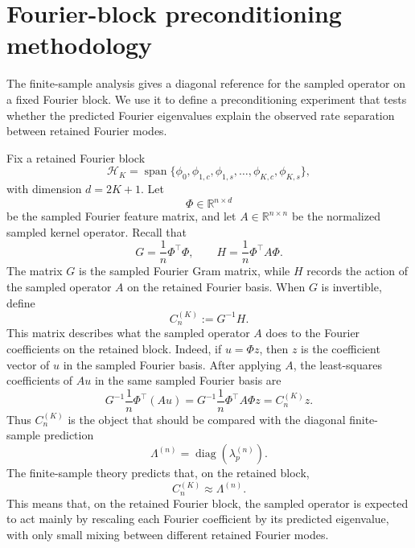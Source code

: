 \section{Fourier-block preconditioning methodology}
\label{sec:method-preconditioning}

The finite-sample analysis gives a diagonal reference for the sampled operator on
a fixed Fourier block. We use it to define a preconditioning experiment that tests
whether the predicted Fourier eigenvalues explain the observed rate separation
between retained Fourier modes.

Fix a retained Fourier block
\[
	\mathcal H_K
	=
	\operatorname{span}\{\phi_0,\phi_{1,c},\phi_{1,s},\dots,\phi_{K,c},\phi_{K,s}\},
\]
with dimension \(d=2K+1\). Let
\[
	\Phi\in\mathbb R^{n\times d}
\]
be the sampled Fourier feature matrix, and let \(A\in\mathbb R^{n\times n}\) be
the normalized sampled kernel operator. Recall that
\begin{equation}
	G=\frac1n\Phi^\top\Phi,
	\qquad
	H=\frac1n\Phi^\top A\Phi.
	\label{eq:method-preconditioning-GH}
\end{equation}
The matrix \(G\) is the sampled Fourier Gram matrix, while \(H\) records the
action of the sampled operator \(A\) on the retained Fourier basis.
When \(G\) is invertible, define
\begin{equation}
	C_n^{(K)}
	:=
	G^{-1}H.
	\label{eq:method-sampled-coefficient-operator}
\end{equation}
This matrix describes what the sampled operator \(A\) does to the Fourier
coefficients on the retained block. Indeed, if \(u=\Phi z\), then \(z\) is the
coefficient vector of \(u\) in the sampled Fourier basis. After applying \(A\),
the least-squares coefficients of \(Au\) in the same sampled Fourier basis are
\begin{equation}
	G^{-1}\frac1n\Phi^\top (Au)
	=
	G^{-1}\frac1n\Phi^\top A\Phi z
	=
	C_n^{(K)}z.
	\label{eq:method-sampled-coefficient-action}
\end{equation}
Thus \(C_n^{(K)}\) is the object that should be compared with the diagonal
finite-sample prediction
\begin{equation}
	\Lambda^{(n)}
	=
	\operatorname{diag}(\lambda_p^{(n)}).
	\label{eq:method-preconditioning-lambda-n}
\end{equation}
The finite-sample theory predicts that, on the retained block,
\begin{equation}
	C_n^{(K)}
	\approx
	\Lambda^{(n)}.
	\label{eq:method-coefficient-operator-approx}
\end{equation}
This means that, on the retained Fourier block, the sampled operator is expected
to act mainly by rescaling each Fourier coefficient by its predicted eigenvalue,
with only small mixing between different retained Fourier modes.

